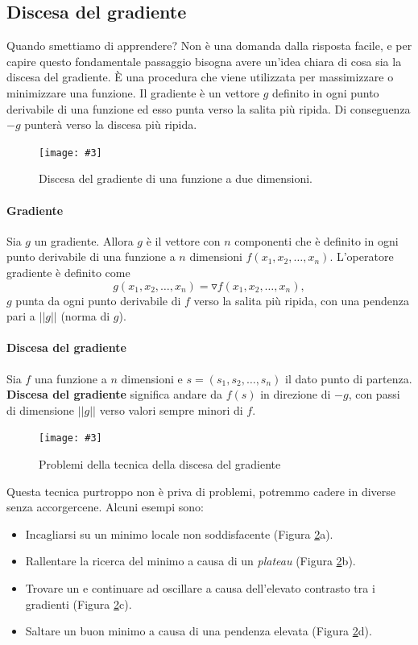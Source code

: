 \documentclass[12pt, twoside, letterpaper]{report}
\newcommand{\img}[4] {
	\begin{figure}
		\centering
		\texttt{[image: \#3]}\\
		\caption{#1}
		\label{#4}
	\end{figure}
}
\begin{document}
			\subsection{Discesa del gradiente}
				Quando smettiamo di apprendere? Non è una domanda dalla risposta facile, e per capire questo fondamentale passaggio bisogna avere un'idea chiara di cosa sia la discesa del gradiente. È una procedura che viene utilizzata per massimizzare o minimizzare una funzione. Il gradiente è un vettore $g$ definito in ogni punto derivabile di una funzione ed esso punta verso la salita più ripida. Di conseguenza $-g$ punterà verso la discesa più ripida.
				\img{Discesa del gradiente di una funzione a due dimensioni. \cite{kriesel}}{0.5}{gradient_descent_2d.png}{gradient_descent}

				\paragraph{Gradiente} Sia $g$ un gradiente. Allora $g$ è il vettore con $n$ componenti che è definito in ogni punto derivabile di una funzione a $n$ dimensioni $f(x_1, x_2, \dots, x_n)$. L'operatore gradiente è definito come $$g(x_1, x_2, \dots, x_n) = \triangledown f(x_1, x_2, \dots, x_n),$$
					$g$ punta da ogni punto derivabile di $f$ verso la salita più ripida, con una pendenza pari a $||g||$ (norma di $g$). \cite{kriesel}
				
				\paragraph{Discesa del gradiente} Sia $f$ una funzione a $n$ dimensioni e $s=(s_1, s_2, \dots, s_n)$ il dato punto di partenza. \textbf{Discesa del gradiente} significa andare da $f(s)$ in direzione di $-g$, con passi di dimensione $||g||$ verso valori sempre minori di $f$. \cite{kriesel}
				
				\img{Problemi della tecnica della discesa del gradiente \cite{kriesel}}{0.4}{gradient_descent.png}{gradient_descent}
				
				Questa tecnica purtroppo non è priva di problemi, potremmo cadere in diverse  senza accorgercene. Alcuni esempi sono: 
				\begin{itemize}
				 	\item Incagliarsi su un minimo locale non soddisfacente (Figura \ref{gradient_descent}a).
				 	\item Rallentare la ricerca del minimo a causa di un \textit{plateau} (Figura \ref{gradient_descent}b).
				 	\item Trovare un  e continuare ad oscillare a causa dell'elevato contrasto tra i gradienti (Figura \ref{gradient_descent}c).
				 	\item Saltare un buon minimo a causa di una pendenza elevata (Figura \ref{gradient_descent}d).
				 \end{itemize} 
				 
\end{document}
